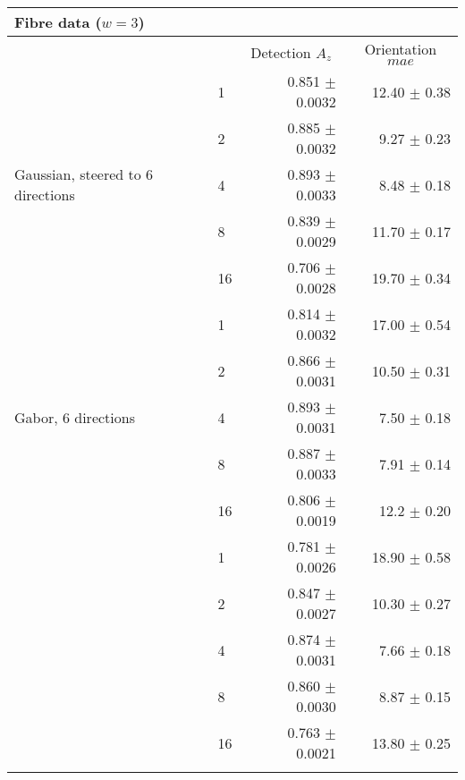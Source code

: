 
\begin{tabularx}{\columnwidth}{X X r r}
\toprule
\multicolumn{4}{p{\columnwidth}}{ Fibre data ($w = 3$)} \\
\midrule
        &                               & \multicolumn{1}{c}{Detection  \linebreak $A_z$}
                                        & \multicolumn{1}{c}{Orientation  \linebreak $mae$} \\
\midrule
\multirow{5}{2cm}{Gaussian, steered to 6 directions}
        & 1     & 0.851 $\pm$ 0.0032    & 12.40 $\pm$ 0.38 \\
        & 2     & 0.885 $\pm$ 0.0032    & 9.27 $\pm$ 0.23 \\
        & 4     & 0.893 $\pm$ 0.0033    & 8.48 $\pm$ 0.18 \\
        & 8     & 0.839 $\pm$ 0.0029    & 11.70 $\pm$ 0.17 \\
        & 16    & 0.706 $\pm$ 0.0028    & 19.70 $\pm$ 0.34 \\

\midrule
\multirow{5}{2cm}{Gabor, 6 directions}
        & 1     & 0.814 $\pm$ 0.0032    & 17.00 $\pm$ 0.54 \\
        & 2     & 0.866 $\pm$ 0.0031    & 10.50 $\pm$ 0.31 \\
        & 4     & 0.893 $\pm$ 0.0031    & 7.50 $\pm$ 0.18 \\
        & 8     & 0.887 $\pm$ 0.0033    & 7.91 $\pm$ 0.14 \\
        & 16    & 0.806 $\pm$ 0.0019    & 12.2 $\pm$ 0.20 \\
\midrule
\multirow{5}{2cm}{\dtcwt{}}
        & 1     & 0.781 $\pm$ 0.0026    & 18.90 $\pm$ 0.58 \\
        & 2     & 0.847 $\pm$ 0.0027    & 10.30 $\pm$ 0.27 \\
        & 4     & 0.874 $\pm$ 0.0031    & 7.66 $\pm$ 0.18\\
        & 8     & 0.860 $\pm$ 0.0030    & 8.87 $\pm$ 0.15 \\
        & 16    & 0.763 $\pm$ 0.0021    & 13.80 $\pm$ 0.25 \\


\bottomrule
\noalign{\smallskip}
\end{tabularx} 